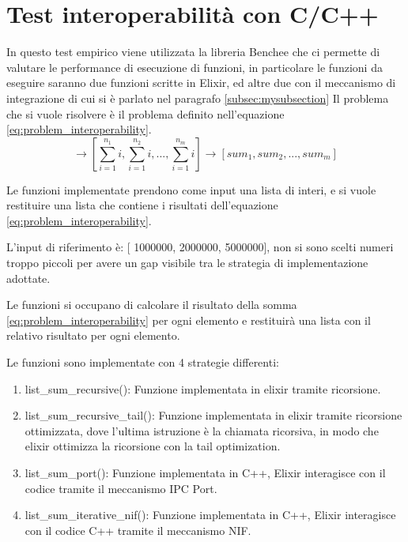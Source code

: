\section{Test interoperabilità con C/C++}

\renewcommand\lstlistingname{Listing}

In questo test empirico viene utilizzata la libreria Benchee
che ci permette di valutare le performance di esecuzione di
funzioni, in particolare le funzioni da eseguire saranno due funzioni
scritte in Elixir, ed altre due con il meccanismo di integrazione
di cui si è parlato nel paragrafo \ref{subsec:mysubsection}
Il problema che si vuole risolvere è il problema definito
nell'equazione \ref{eq:problem_interoperability}.
\begin{equation}
	[n_{1},n{_2}...n{_m}] \rightarrow [\sum_{i=1}^{n_{1}}i,\sum_{i=1}^{n_{2}}i,...,\sum_{i=1}^{n_{m}}i]
  \rightarrow [sum_{1},sum_{2},...,sum_{m}]
  \label{eq:problem_interoperability}
\end{equation}

Le funzioni implementate prendono come input una lista
di interi, e si vuole restituire una lista che contiene
i risultati dell'equazione \ref{eq:problem_interoperability}.

L'input di riferimento è: [ 1000000, 2000000, 5000000], non si
sono scelti numeri troppo piccoli per avere un gap visibile
tra le strategia di implementazione adottate.

Le funzioni si occupano di calcolare il risultato della somma
\ref{eq:problem_interoperability} per ogni elemento e
restituirà una lista con il relativo risultato per ogni elemento.

Le funzioni sono implementate con 4 strategie differenti:
\begin{enumerate}
	\item list\_sum\_recursive(): Funzione implementata in elixir
	tramite ricorsione.
	\item list\_sum\_recursive\_tail(): Funzione implementata in elixir
	tramite ricorsione ottimizzata, dove l'ultima istruzione è la
	chiamata ricorsiva, in modo che elixir ottimizza la ricorsione
	con la tail optimization.
	\item list\_sum\_port(): Funzione implementata in C++, Elixir interagisce
	con il codice tramite il meccanismo IPC Port.
	\item list\_sum\_iterative\_nif(): Funzione implementata in C++, Elixir
	interagisce con il codice C++ tramite il meccanismo NIF.
\end{enumerate}

